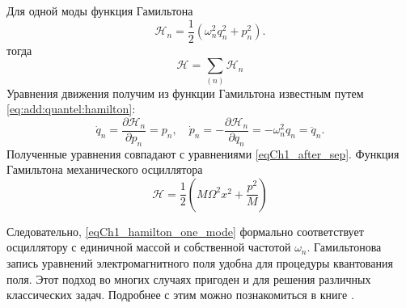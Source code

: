 Для одной моды функция Гамильтона  
\begin{equation}
\mathcal{H}_n = \frac{1}{2}\left(\omega_n^2 q_n^2 + p_n^2\right).
\label{eqCh1_hamilton_one_mode}
\end{equation}
тогда
\begin{equation}
\mathcal{H} = \sum_{(n)} \mathcal{H}_n
\label{eqCh1_hamilton_sum_mode}
\end{equation}
Уравнения движения получим из функции Гамильтона известным путем
\eqref{eq:add:quantel:hamilton}:
\begin{equation}
\dot{q}_n = \frac{\partial \mathcal{H}_n}{\partial p_n} = p_n,
\quad
\dot{p}_n = - \frac{\partial \mathcal{H}_n}{\partial q_n} =
- \omega_n^2 q_n = \ddot{q}_n.
\end{equation}
Полученные уравнения совпадают с уравнениями \eqref{eqCh1_after_sep}.  
Функция Гамильтона механического осциллятора
\[
\mathcal{H} = \frac{1}{2}\left(M \Omega^2 x^2 + \frac{p^2}{M}\right)
\]

Следовательно, \eqref{eqCh1_hamilton_one_mode} формально соответствует
осциллятору с единичной массой и собственной частотой $\omega_n$.
Гамильтонова запись уравнений 
электромагнитного поля удобна для процедуры квантования поля. Этот
подход во многих случаях пригоден и для решения различных классических
задач. Подробнее с этим можно познакомиться в книге
\cite{bCh1Quantel_Gin}.  

